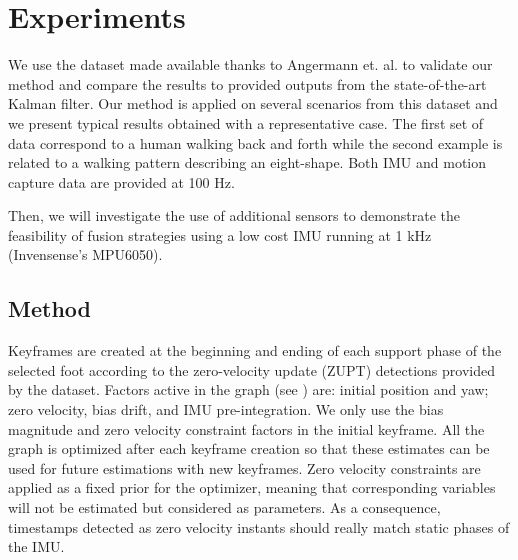 
\section{Experiments} \label{sec:experiments}

We use the dataset made available thanks to Angermann et. al. \cite{angermann2010high} to validate our method and compare the results to provided outputs from the state-of-the-art Kalman filter.
Our method is applied on several scenarios from this dataset and we present typical results obtained with a representative case. 
The first set of data correspond to a human walking back and forth 
while the second example is related to a walking pattern describing an eight-shape. 
Both IMU and motion capture data are provided at 100 Hz.

Then, we will investigate the use of additional sensors to demonstrate the feasibility of fusion strategies using a low cost IMU running at 1 kHz (Invensense's MPU6050).


\subsection{Method}

Keyframes are created at the beginning and ending of each support phase of the selected foot according to the zero-velocity update (ZUPT) detections provided by the dataset. Factors active in the graph (see ) are: initial position and yaw; zero velocity, bias drift, and IMU pre-integration. We only use the bias magnitude 
and zero velocity constraint factors in the initial keyframe. All the graph is optimized after each keyframe creation so that these estimates can be used for future estimations with new keyframes. Zero velocity constraints are applied 
as a fixed prior for the optimizer, meaning that corresponding variables will not be estimated but considered as parameters. 
As a consequence, timestamps detected as zero velocity instants should really match static phases of the IMU. 

